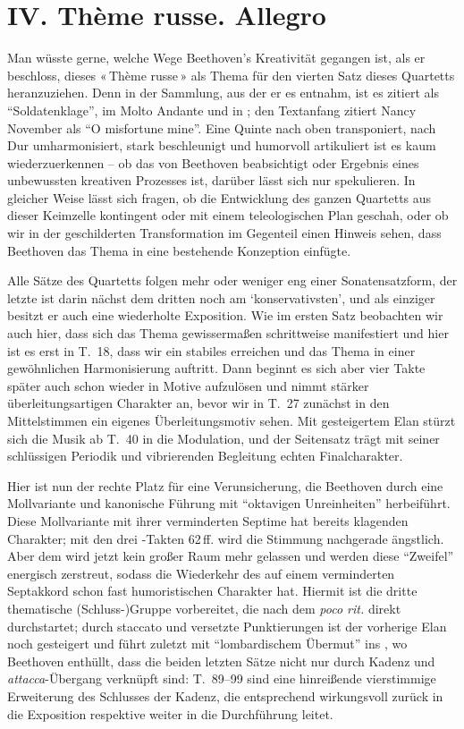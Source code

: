 \section{IV. Thème russe. Allegro}

Man wüsste gerne, welche Wege Beethoven’s Kreativität gegangen
ist, als er beschloss, dieses «\,Thème russe\,» als Thema für
den vierten Satz dieses Quartetts heranzuziehen.  Denn in
der Sammlung, aus der er es entnahm, ist es zitiert als
\enquote{Soldatenklage}, im Molto Andante und in ;
den Textanfang zitiert Nancy November als \foreignquote{english}{O
misfortune mine}.\cite[p.~83]{november}  Eine Quinte nach oben
transponiert, nach Dur umharmonisiert, stark beschleunigt und
humorvoll artikuliert ist es kaum wiederzuerkennen – ob das von
Beethoven beabsichtigt oder Ergebnis eines unbewussten kreativen
Prozesses ist, darüber lässt sich nur spekulieren.  In gleicher
Weise lässt sich fragen, ob die Entwicklung des ganzen Quartetts
aus dieser Keimzelle kontingent oder mit einem teleologischen
Plan geschah, oder ob wir in der geschilderten Transformation
im Gegenteil einen Hinweis sehen, dass Beethoven das Thema in
eine bestehende Konzeption einfügte.

Alle Sätze des Quartetts folgen mehr oder weniger eng einer
Sonatensatzform, der letzte ist darin nächst dem dritten noch
am \enquote*{konservativsten}, und als einziger besitzt er
auch eine wiederholte Exposition.  Wie im ersten Satz beobachten
wir auch hier, dass sich das Thema gewissermaßen schrittweise
manifestiert und hier ist es erst in T.~18, dass wir ein stabiles
 erreichen und das Thema in einer gewöhnlichen
Harmonisierung auftritt.  Dann beginnt es sich aber vier Takte
später auch schon wieder in Motive aufzulösen und nimmt stärker
überleitungsartigen Charakter an, bevor wir in T.~27 zunächst
in den Mittelstimmen ein eigenes Überleitungsmotiv sehen.  Mit
gesteigertem Elan stürzt sich die Musik ab T.~40 in die Modulation,
und der Seitensatz trägt mit seiner schlüssigen Periodik und
vibrierenden Begleitung echten Finalcharakter.

Hier ist nun der rechte Platz für eine Verunsicherung, die
Beethoven durch eine Mollvariante und kanonische Führung mit
\enquote{oktavigen Unreinheiten}\cite[Nr. 262]{adorno}
herbeiführt.  Diese Mollvariante mit ihrer verminderten Septime
hat bereits klagenden Charakter; mit den drei -Takten
62\,ff. wird die Stimmung nachgerade ängstlich.  Aber dem wird
jetzt kein großer Raum mehr gelassen und  werden
diese \enquote{Zweifel} energisch zerstreut, sodass die Wiederkehr
des  auf einem verminderten Septakkord schon
fast humoristischen Charakter hat.  Hiermit ist die dritte thematische
(Schluss-)Gruppe vorbereitet, die nach dem \textit{poco rit.} direkt
durchstartet; durch staccato und versetzte Punktierungen ist der
vorherige Elan noch gesteigert und führt zuletzt mit
\enquote{lombardischem Übermut} ins , wo Beethoven
enthüllt, dass die beiden letzten Sätze nicht nur durch Kadenz und
\textit{attacca}-Übergang verknüpft sind: T.~89–99 sind eine hinreißende
vierstimmige Erweiterung des Schlusses der Kadenz, die entsprechend
wirkungsvoll zurück in die Exposition respektive weiter in die
Durchführung leitet.

